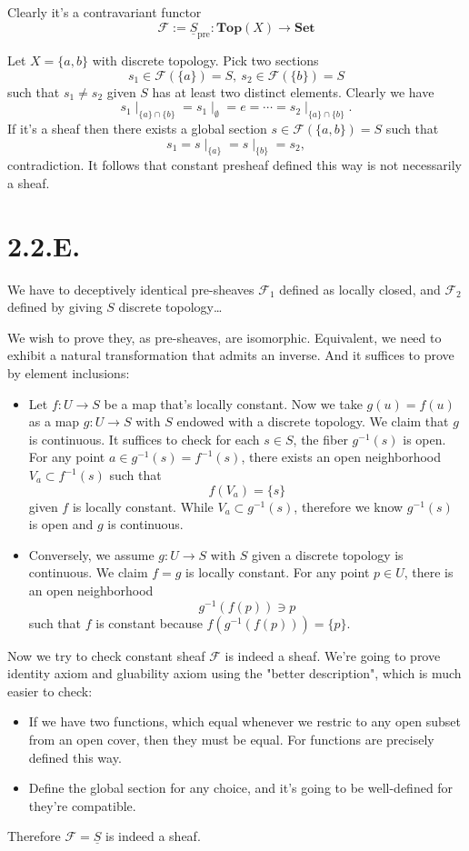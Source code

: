 \subsection{}
Clearly it's a contravariant functor 
\[\mathscr F:=\underline{S}_{\text{pre}}:\mathbf{Top}(X)\to \mathbf{Set}\]

Let $X=\{a,b\}$ with discrete topology. Pick two sections 
\[s_1\in\mathscr F(\{a\})=S,~ s_2\in\mathscr F(\{b\})=S\] such that $s_1\neq s_2$ given $S$ has at least two distinct elements. 
Clearly we have 
\[s_1\mid_{\{a\}\cap \{b\}}=s_1\mid_{\emptyset}=e=\cdots=s_2\mid_{\{a\}\cap\{b\}}.\]
If it's a sheaf then there exists a global section $s\in\mathscr F(\{a,b\})=S$ such that 
\[s_1=s\mid_{\{a\}}=s\mid_{\{b\}}=s_2,\] contradiction. It follows that constant presheaf defined this way is not necessarily a sheaf.

\section{2.2.E.}

We have to deceptively identical pre-sheaves $\mathscr F_1$ defined as locally closed, and $\mathscr F_2$ defined by giving $S$ discrete topology\dots 

We wish to prove they, as pre-sheaves, are isomorphic. Equivalent, we need to exhibit a natural transformation that admits an inverse. And it suffices to prove by element inclusions: 
\begin{itemize}
	\item Let $f:U\to S$ be a map that's locally constant. Now we take $g(u)=f(u)$ as a map $g:U\to S$ with $S$ endowed with a discrete topology. We claim that $g$ is continuous. It suffices to check for each $s\in S$, the fiber $g^{-1}(s)$ is open. For any point $a\in g^{-1}(s)=f^{-1}(s)$, there exists an open neighborhood $V_a\subset f^{-1}(s)$ such that 
	\[f(V_a)=\{s\}\] given $f$ is locally constant. While $V_a\subset g^{-1}(s)$, therefore we know $g^{-1}(s)$ is open and $g$ is continuous. 
	\item Conversely, we assume $g:U\to S$ with $S$ given a discrete topology is continuous. We claim $f=g$ is locally constant. For any point $p\in U$, there is an open neighborhood \[g^{-1}(f(p))\ni p\] such that $f$ is constant because $f(g^{-1}(f(p)))=\{p\}$. 
\end{itemize}

Now we try to check constant sheaf $\mathscr F$ is indeed a sheaf. We're going to prove identity axiom and gluability axiom using the "better description", which is much easier to check:
\begin{itemize}
	\item If we have two functions, which equal whenever we restric to any open subset from an open cover, then they must be equal. For functions are precisely defined this way.
	\item Define the global section for any choice, and it's going to be well-defined for they're compatible.
\end{itemize}
Therefore $\mathscr F=\underline S$ is indeed a sheaf. 
 
